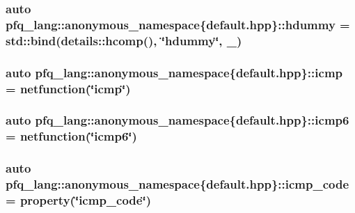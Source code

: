 \hypertarget{namespacepfq__lang_1_1anonymous__namespace_02default_8hpp_03_a4e7cf4874b42c5722f420fc54f360242}{
\subsubsection[{hdummy}]{\setlength{\rightskip}{0pt plus 5cm}auto pfq\-\_\-lang\-::anonymous\-\_\-namespace\{default.\-hpp\}\-::hdummy = std\-::bind(details\-::hcomp(), \char`\"{}hdummy\char`\"{}, \-\_)}}\label{namespacepfq__lang_1_1anonymous__namespace_02default_8hpp_03_a4e7cf4874b42c5722f420fc54f360242}
\hypertarget{namespacepfq__lang_1_1anonymous__namespace_02default_8hpp_03_a180c8185595965a528fd2590da7dbeb9}{
\subsubsection[{icmp}]{\setlength{\rightskip}{0pt plus 5cm}auto pfq\-\_\-lang\-::anonymous\-\_\-namespace\{default.\-hpp\}\-::icmp = {\bf netfunction}(\char`\"{}icmp\char`\"{})}}\label{namespacepfq__lang_1_1anonymous__namespace_02default_8hpp_03_a180c8185595965a528fd2590da7dbeb9}
\hypertarget{namespacepfq__lang_1_1anonymous__namespace_02default_8hpp_03_ab1e01b177ae34e48f61eed78580aeac0}{
\subsubsection[{icmp6}]{\setlength{\rightskip}{0pt plus 5cm}auto pfq\-\_\-lang\-::anonymous\-\_\-namespace\{default.\-hpp\}\-::icmp6 = {\bf netfunction}(\char`\"{}icmp6\char`\"{})}}\label{namespacepfq__lang_1_1anonymous__namespace_02default_8hpp_03_ab1e01b177ae34e48f61eed78580aeac0}
\hypertarget{namespacepfq__lang_1_1anonymous__namespace_02default_8hpp_03_aad0f666aca065f5aaf283857e5c933ce}{
\subsubsection[{icmp\-\_\-code}]{\setlength{\rightskip}{0pt plus 5cm}auto pfq\-\_\-lang\-::anonymous\-\_\-namespace\{default.\-hpp\}\-::icmp\-\_\-code = {\bf property}(\char`\"{}icmp\-\_\-code\char`\"{})}}\label{namespacepfq__lang_1_1anonymous__namespace_02default_8hpp_03_aad0f666aca065f5aaf283857e5c933ce}

